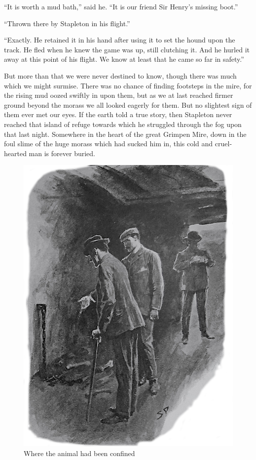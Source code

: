\documentclass[paper=5.5in:8.5in,BCOR=7mm,twoside,DIV=calc,12pt,usegeometry,openany,chapterprefix,endperiod,headings=big]{scrbook} %
\begin{document}
\enquote{It is worth a mud bath,} said he. \enquote{It is our friend Sir Henry's missing boot.}

\enquote{Thrown there by Stapleton in his flight.}

\enquote{Exactly. He retained it in his hand after using it to set the hound upon the track. He fled when he knew the game was up, still clutching it. And he hurled it away at this point of his flight. We know at least that he came so far in safety.}

But more than that we were never destined to know, though there was much which we might surmise. There was no chance of finding footsteps in the mire, for the rising mud oozed swiftly in upon them, but as we at last reached firmer ground beyond the morass we all looked eagerly for them. But no slightest sign of them ever met our eyes. If the earth told a true story, then Stapleton never reached that island of refuge towards which he struggled through the fog upon that last night. Somewhere in the heart of the great Grimpen Mire, down in the foul slime of the huge morass which had sucked him in, this cold and cruel-hearted man is forever buried.

\begin{figure}[h!]
\centering
\includegraphics[width=0.8\linewidth]{14_creatureconfined}
\caption{Where the animal had been confined}
\end{figure}
\end{document}
